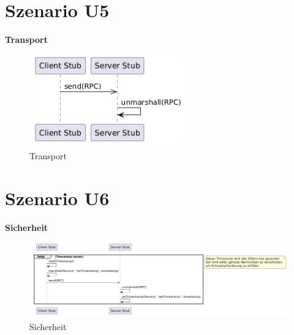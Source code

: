 \section{Szenario U5}
\textbf{Transport}\\
\begin{figure}[h!]
	\centering
	\includegraphics[width=0.8\linewidth]{diagrams/Transport.png}
	\caption{Transport}
	\label{fig:Transport}
\end{figure}


\section{Szenario U6}
\textbf{Sicherheit}\\
\begin{figure}[h!]
	\centering
	\includegraphics[width=0.8\linewidth]{diagrams/Sicherheit.png}
	\caption{Sicherheit}
	\label{fig:Sicherheit}
\end{figure}



